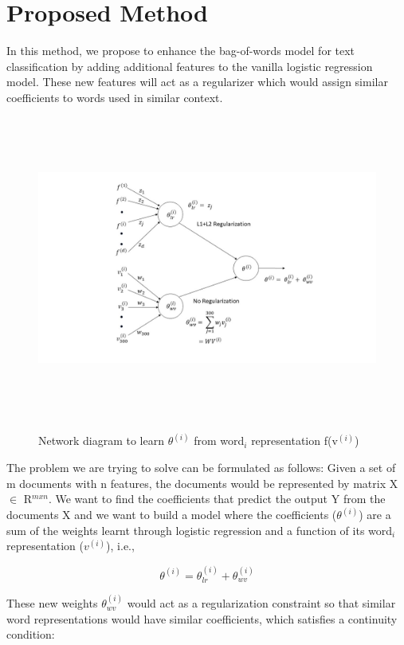 \newpage
\section{Proposed Method}

In this method, we propose to enhance the bag-of-words model for text classification by adding additional features to the vanilla logistic regression model. These new features will act as a regularizer which would assign similar coefficients to words used in similar context.

\begin{figure}[htbp]
\centering
\includegraphics[width=16cm, height=10cm]{images/Fig3.jpg}\\
\centering
\caption{Network diagram to learn $\theta^{(i)}$ from word$_{i}$ representation f(v$^{(i)}$)}
\label{fig:foo}
\end{figure}

The problem we are trying to solve can be formulated as follows: Given a set of m documents with n features, the documents would be represented by matrix X $\in$ R$^{m x n}$. We want to find the coefficients that predict the output Y from the documents X and we want to build a model where the coefficients ($\theta^{(i)}$) are a sum of the weights learnt through logistic regression and a function of its word$_{i}$ representation ($v^{(i)}$), i.e.,

\begin{equation}\label{lb1}
\theta^{(i)} = \theta_{lr}^{(i)} + \theta_{wv}^{(i)}
\end{equation}

These new weights $\theta_{wv}^{(i)}$ would act as a regularization constraint so that similar word representations would have similar coefficients, which satisfies a continuity condition:

